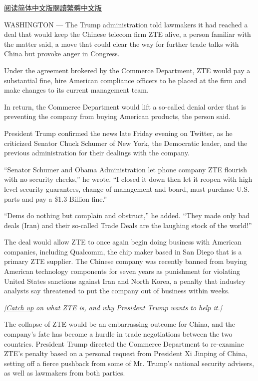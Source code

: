 \href{http://cn.nytimes.com/usa/20180528/trump-trade-zte/}{阅读简体中文版}\href{http://cn.nytimes.com/usa/20180528/trump-trade-zte/zh-hant/}{閱讀繁體中文版}

WASHINGTON --- The Trump administration told lawmakers it had reached a
deal that would keep the Chinese telecom firm ZTE alive, a person
familiar with the matter said, a move that could clear the way for
further trade talks with China but provoke anger in Congress.

Under the agreement brokered by the Commerce Department, ZTE would pay a
substantial fine, hire American compliance officers to be placed at the
firm and make changes to its current management team.

In return, the Commerce Department would lift a so-called denial order
that is preventing the company from buying American products, the person
said.

President Trump confirmed the news late Friday evening on Twitter, as he
criticized Senator Chuck Schumer of New York, the Democratic leader, and
the previous administration for their dealings with the company.

``Senator Schumer and Obama Administration let phone company ZTE
flourish with no security checks,'' he wrote. ``I closed it down then
let it reopen with high level security guarantees, change of management
and board, must purchase U.S. parts and pay a \$1.3 Billion fine.''

``Dems do nothing but complain and obstruct,'' he added. ``They made
only bad deals (Iran) and their so-called Trade Deals are the laughing
stock of the world!''

The deal would allow ZTE to once again begin doing business with
American companies, including Qualcomm, the chip maker based in San
Diego that is a primary ZTE supplier. The Chinese company was recently
banned from buying American technology components for seven years as
punishment for violating United States sanctions against Iran and North
Korea, a penalty that industry analysts say threatened to put the
company out of business within weeks.

\emph{{[}}\href{https://www.nytimes.com/2018/06/07/business/what-is-zte.html}{\emph{Catch
up}} \emph{on what ZTE is, and why President Trump wants to help it.{]}}

The collapse of ZTE would be an embarrassing outcome for China, and the
company's fate has become a hurdle in trade negotiations between the two
countries. President Trump directed the Commerce Department to
re-examine ZTE's penalty based on a personal request from President Xi
Jinping of China, setting off a fierce pushback from some of Mr. Trump's
national security advisers, as well as lawmakers from both parties.


